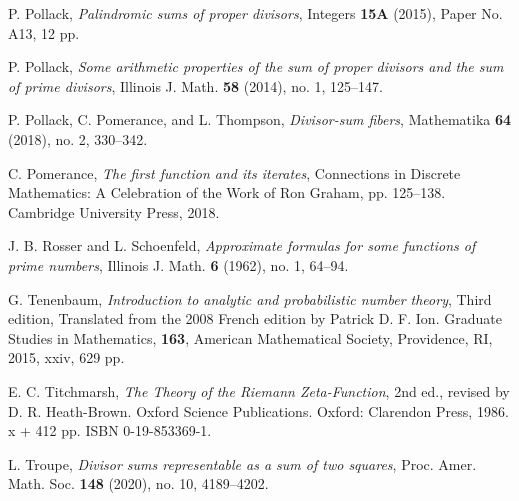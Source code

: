 \documentclass[11pt, reqno]{amsart}
\theoremstyle{remark}
\numberwithin{theorem}{section}
\numberwithin{proposition}{section}
\numberwithin{lemma}{section}
\numberwithin{corollary}{section}
\numberwithin{equation}{section}
\numberwithin{conjecture}{section}
\numberwithin{definition}{section}
\begin{document}
\begin{bibsection}
\begin{biblist}
    P. Pollack, \emph{Palindromic sums of proper divisors}, Integers {\bf 15A} (2015), Paper No. A13, 12 pp.
	
    P. Pollack, \emph{Some arithmetic properties of the sum of proper divisors and the sum of prime divisors}, Illinois J. Math. \textbf{58} (2014), no. 1, 125--147.
	
    P. Pollack, C. Pomerance, and L. Thompson, \emph{Divisor-sum fibers}, Mathematika \textbf{64} (2018), no. 2, 330--342. 

    

C. Pomerance, \emph{The first function and its iterates}, Connections in Discrete Mathematics: A Celebration of the Work of Ron Graham, pp. 125--138. Cambridge University Press, 2018.
    


 J. B. Rosser and L. Schoenfeld, \emph{Approximate formulas for some functions of prime numbers}, Illinois J. Math. \textbf{6} (1962), no. 1, 64--94.

    G. Tenenbaum, \emph{Introduction to analytic and probabilistic number theory}, Third edition, Translated from the 2008 French edition by Patrick D. F. Ion. Graduate Studies in Mathematics, \textbf{163}, American Mathematical Society, Providence, RI, 2015, xxiv, 629 pp.

E. C. Titchmarsh, \emph{The Theory of the Riemann Zeta-Function}, 2nd ed., revised by D. R. Heath-Brown. Oxford Science Publications. Oxford: Clarendon Press, 1986. x + 412 pp. ISBN 0-19-853369-1.
 


     L. Troupe, \emph{Divisor sums representable as a sum of two squares}, Proc. Amer. Math. Soc. \textbf{148} (2020), no. 10, 4189--4202.




	\end{biblist}
\end{bibsection}
\end{document}
